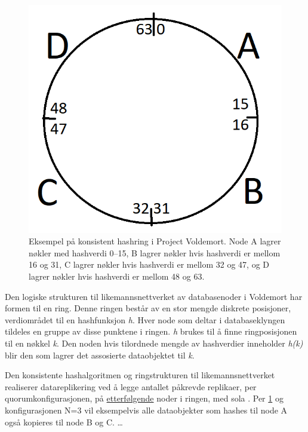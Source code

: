 \begin{figure}[ht]
    \centering
    \includegraphics{fig/hashring.png}
    \caption{Eksempel på konsistent hashring i Project Voldemort. Node A lagrer nøkler med hashverdi 0--15, B lagrer nøkler hvis hashverdi er mellom 16 og 31, C lagrer nøkler hvis hashverdi er mellom 32 og 47, og D lagrer nøkler hvis hashverdi er mellom 48 og 63.}
    \label{fig4}
\end{figure}

Den logiske strukturen til likemannsnettverket av databasenoder i Voldemort har formen til en ring. Denne ringen består av en stor mengde diskrete posisjoner, verdiområdet til en hashfunksjon \emph{h}. Hver node som deltar i databaseklyngen tildeles en gruppe av disse punktene i ringen. \emph{h} brukes til å finne ringposisjonen til en nøkkel \emph{k}. Den noden hvis tilordnede mengde av hashverdier inneholder \emph{h(k)} blir den som lagrer det assosierte dataobjektet til \emph{k}.

Den konsistente hashalgoritmen og ringstrukturen til likemannsnettverket realiserer datareplikering ved å legge antallet påkrevde replikaer, per quorumkonfigurasjonen, på \underline{etterfølgende} noder i ringen, med sola \citep{elmasri2014}. Per \ref{fig4} og konfigurasjonen N=3 vil eksempelvis alle dataobjekter som hashes til node A også kopieres til node B og C.
\ldots

